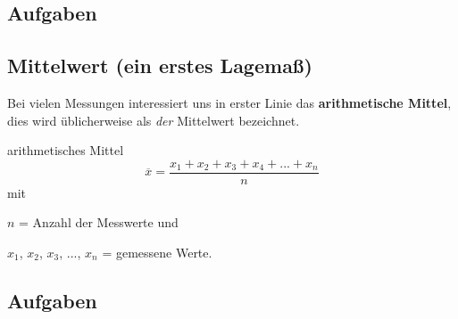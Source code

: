\subsection*{Aufgaben}
\newpage


\subsection{Mittelwert (ein erstes Lagemaß)}
Bei vielen Messungen interessiert uns in erster Linie das
\textbf{arithmetische Mittel}, dies wird
üblicherweise als \textit{der} Mittelwert bezeichnet.

\begin{definition}{arithmetisches Mittel}{}
  $$\overline{x} = \frac{x_1 + x_2 + x_3 + x_4 + ... + x_n}{n}$$
  mit
  
  $n$ = Anzahl der Messwerte und

  $x_1$, $x_2$, $x_3$, ..., $x_n$ = gemessene Werte.
  \end{definition}

\subsection*{Aufgaben}
\newpage
